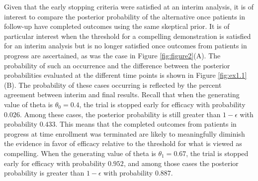 \documentclass[12pt]{article}
\begin{document}
Given that the early stopping criteria were satisfied at an interim analysis, it is of interest to compare the posterior probability of the alternative once patients in follow-up have completed outcomes using the same skeptical prior.
%
It is of particular interest when the threshold for a compelling demonstration is satisfied for an interim analysis but is no longer satisfied once outcomes from patients in progress are ascertained, as was the case in Figure \ref{fig:figure2}(A).
%
The probability of such an occurrence and the difference between the posterior probabilities evaluated at the different time points is shown in Figure \ref{fig:ex1.1}(B).
%
The probability of these cases occurring is reflected by the percent agreement between interim and final results.
%
Recall that when the generating value of theta is $\theta_0=0.4$, the trial is stopped early for efficacy with probability $0.026$. Among these cases, the posterior probability is still greater than $1-\epsilon$ with probability $0.433$. 
%
This means that the completed outcomes from patients in progress at time enrollment was terminated are likely to meaningfully diminish the evidence in favor of efficacy relative to the threshold for what is viewed as compelling.
%
When the generating value of theta is $\theta_1=0.67$, the trial is stopped early for efficacy with probability $0.952$, and among those cases the posterior probability is  greater than $1-\epsilon$ with probability $0.887$.
\end{document}

